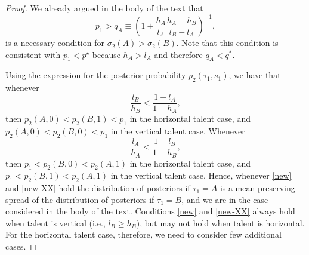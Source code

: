 \documentclass[12pt,american]{paper}
\theoremstyle{remark}
\begin{document}
\begin{proof}


We already argued in the body of the text that 
\begin{equation}\label{cond*}
p_1>q_A \equiv\left(1+\frac{h_A}{l_A}\frac{h_A-h_B}{l_B-l_A}\right)^{-1},
\end{equation}
is a necessary condition for $\sigma_2(A)>\sigma_2(B)$. Note that this condition is consistent with $p_1 < p^\star$ because $h_A>l_A$ and therefore $q_A<q^*$.  

Using the expression for the posterior probability $p_2(\tau_1,s_1)$, we have that whenever
\begin{equation}\label{new}
\frac{l_B}{h_B}<\frac{1-l_A}{1-h_A},
\end{equation}
then $p_2(A,0)<p_2(B,1)<p_1$ in the horizontal talent case, and $p_2(A,0)<p_2(B,0)<p_1$ in the vertical talent case. Whenever
\begin{equation}\label{new-XX}
\frac{l_A}{h_A}<\frac{1-l_B}{1-h_B},
\end{equation}
then $p_1<p_2(B,0)<p_2(A,1)$ in the horizontal talent case, and $p_1<p_2(B,1)<p_2(A,1)$ in the vertical talent case. Hence, whenever \eqref{new} and \eqref{new-XX} hold the distribution of posteriors if $\tau_1=A$ is a mean-preserving spread of the distribution of posteriors if $\tau_1=B$, and we are in the case considered in the body of the text.  Conditions \eqref{new} and \eqref{new-XX} always hold when talent is vertical (i.e., $l_B \geq h_B$), but may not hold when talent is horizontal. For the horizontal talent case, therefore, we need to consider few additional cases.





\end{proof}
\end{document}
